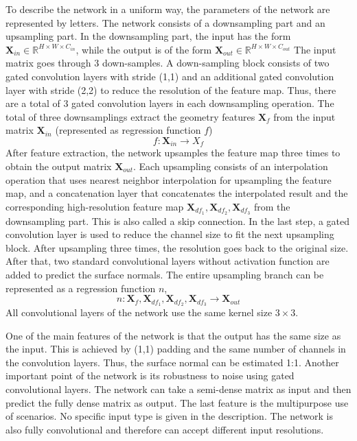 To describe the network in a uniform way, the parameters of the network are represented by letters.
The network consists of a downsampling part and an upsampling part. In the downsampling part, the input has the form $ \textbf{X}_{in} \in \mathbb{R}^{H\times W\times C_{in}}$, while the output is of the form $ \textbf{X}_{out} \in \mathbb{R}^{H\times W\times C_{out}}$
The input matrix goes through 3 down-samples. A down-sampling block consists of two gated convolution layers with stride (1,1) and an additional gated convolution layer with stride (2,2) to reduce the resolution of the feature map. Thus, there are a total of 3 gated convolution layers in each downsampling operation.
The total of three downsamplings extract the geometry features $ \textbf{X}_f $ from the input matrix $ \textbf{X}_{in} $ (represented as regression function $ f $)
\[ f: \textbf{X}_{in} \rightarrow X_f \]
After feature extraction, the network upsamples the feature map three times to obtain the output matrix $ \textbf{X}_{out} $. Each upsampling consists of an interpolation operation that uses nearest neighbor interpolation for upsampling the feature map, and a concatenation layer that concatenates the interpolated result and the corresponding high-resolution feature map $ \textbf{X}_{df_1}, \textbf{X}_{df_2}, \textbf{X}_{df_3} $ from the downsampling part. This is also called a skip connection. In the last step, a gated convolution layer is used to reduce the channel size to fit the next upsampling block. After upsampling three times, the resolution goes back to the original size. After that, two standard convolutional layers without activation function are added to predict the surface normals. The entire upsampling branch can be represented as a regression function $ n $,
\[ n: \textbf{X}_f, \textbf{X}_{df_1}, \textbf{X}_{df_2}, \textbf{X}_{df_3} \rightarrow \textbf{X}_{out} \]
All convolutional layers of the network use the same kernel size $ 3\times 3 $. 


One of the main features of the network is that the output has the same size as the input. This is achieved by (1,1) padding and the same number of channels in the convolution layers. Thus, the surface normal can be estimated 1:1. Another important point of the network is its robustness to noise using gated convolutional layers. The network can take a semi-dense matrix as input and then predict the fully dense matrix as output. The last feature is the multipurpose use of scenarios. No specific input type is given in the description. 
The network is also fully convolutional and therefore can accept different input resolutions. 


